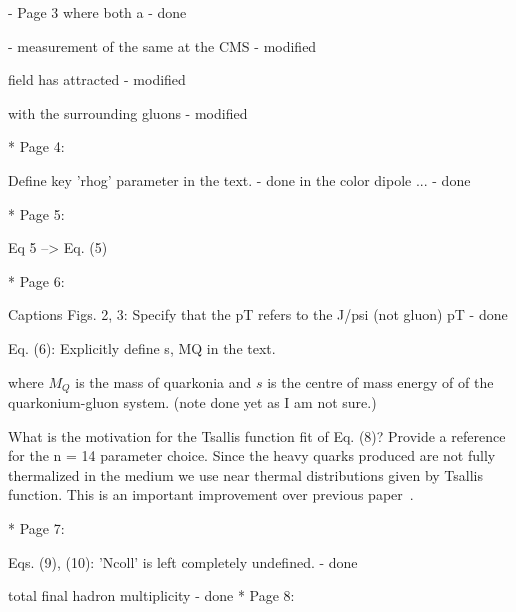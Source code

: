 \documentclass[a4paper,11pt]{article}
\begin{document}
- Page 3 where both a \newline
- {\color{blue} done} \newline

- measurement of the same at the CMS \newline
- {\color{blue} modified} \newline

field has attracted 
- {\color{blue} modified} \newline

 with the surrounding gluons 
 - {\color{blue} modified} \newline
 
* Page 4: \newline

 Define key 'rhog' parameter in the text. \newline 
- {\color{blue} done} \newline
 in the color dipole ... \newline
- {\color{blue} done}\newline

* Page 5: \newline

 Eq 5 --> Eq. (5) \newline

* Page 6: \newline

Captions Figs. 2, 3: Specify that the pT refers to the J/psi (not gluon) pT 
- {\color{blue} done}\newline

Eq. (6): Explicitly define s, MQ in the text.

{\color{red} where $M_{Q}$ is the mass of quarkonia and $s$ is the centre of mass energy of
of the quarkonium-gluon system. (note done yet as I am not sure.)}

What is the motivation for the Tsallis function fit of Eq. (8)? Provide 
a reference for the n = 14 parameter choice. 
{\color{red} Since the heavy quarks produced are not fully thermalized in the medium
  we use near thermal distributions given by Tsallis function. This is an
  important improvement over previous paper~\cite{Kumar:2014kfa}.
}

* Page 7: 

Eqs. (9), (10): 'Ncoll' is left completely undefined.
- {\color{blue} done}\newline

total final hadron multiplicity 
- {\color{blue} done}\newline
* Page 8: 
\end{document}
